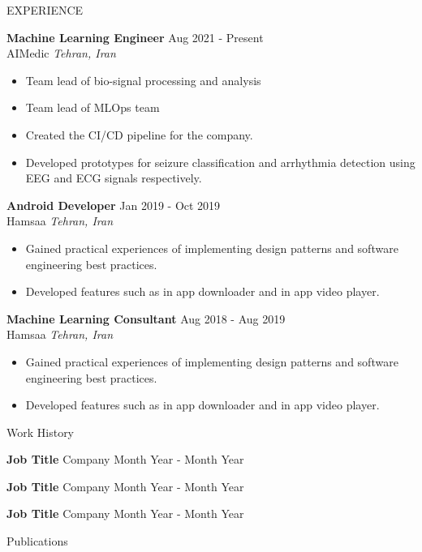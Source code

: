\documentclass{resume} %
\begin{document}
	 \begin{rSection}{EXPERIENCE}
		
		 \textbf{Machine Learning Engineer} \hfill Aug 2021 - Present\\
		 AIMedic \hfill \textit{Tehran, Iran}
		  \begin{itemize}
			     \itemsep -3pt {} 
			      \item Team lead of bio-signal processing and analysis
			      \item Team lead of MLOps team
				  \item Created the CI/CD pipeline for the company.
				  \item Developed prototypes for seizure classification and arrhythmia detection using EEG and ECG signals respectively.
			  \end{itemize}
		
		 \textbf{Android Developer} \hfill Jan 2019 - Oct 2019\\
		 Hamsaa \hfill \textit{Tehran, Iran}
		  \begin{itemize}
			     \itemsep -3pt {} 
			      \item Gained practical experiences of implementing design patterns and software engineering best practices.
			     \item Developed features such as in app downloader and in app video player.
			  \end{itemize}
		  
		  \textbf{Machine Learning Consultant} \hfill Aug 2018 - Aug 2019\\
		  Hamsaa \hfill \textit{Tehran, Iran}
		  \begin{itemize}
		  	\itemsep -3pt {} 
		  	\item Gained practical experiences of implementing design patterns and software engineering best practices.
		  	\item Developed features such as in app downloader and in app video player.
		  \end{itemize}
		
		 \end{rSection} 
	
	\begin{rSection}{Work History}
		\vspace{-1.25em}
		\item \textbf{Job Title} {Company} \hfill Month Year - Month Year
		\item \textbf{Job Title} {Company} \hfill Month Year - Month Year
		\item \textbf{Job Title} {Company} \hfill Month Year - Month Year
	\end{rSection} 
	
	\begin{rSection}{Publications}
		\nocite{*} %
		
		
	\end{rSection}

	
	
\end{document}
